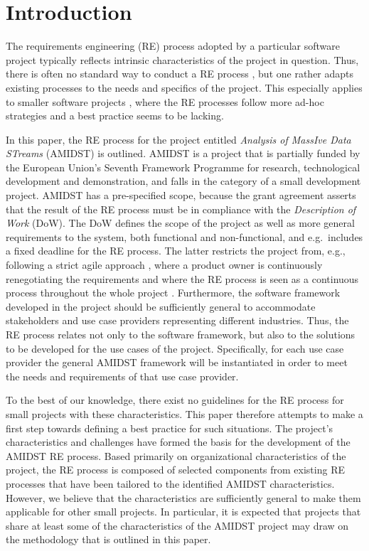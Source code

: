 \section{Introduction}

The requirements engineering (RE) process adopted by a particular software project typically reflects intrinsic
characteristics of the project in question. Thus, there is often no standard way to conduct a RE process \cite{Poh10},
but one rather adapts existing processes to the needs and specifics of the project. This especially applies to smaller
software projects \cite{Qui10,Ara07}, where the RE processes follow
more ad-hoc strategies and a best practice seems to be lacking. 

In this paper, the RE process for the project entitled \emph{Analysis of MassIve Data STreams} (AMIDST) is outlined. AMIDST is a
project that is partially funded by the European Union's Seventh Framework Programme for research, technological
development and demonstration, and falls in the category of a small development project. AMIDST has a pre-specified
scope, because the grant agreement asserts that the result of the RE process must be in compliance with the \emph{Description
  of Work} (DoW). The DoW defines the scope of the project as well as more general requirements to the system, both
functional and non-functional, and e.g.\ includes a fixed deadline for the RE process. The latter restricts the project from,
e.g., following a strict agile approach \cite{Din10},  where a product owner is continuously renegotiating the
requirements and where the RE process is seen as a continuous process throughout the whole project
\cite{Kav11}. Furthermore, the software framework developed in the project should be sufficiently general to accommodate
stakeholders and use case providers representing different industries. Thus, the RE process relates not only to the software framework, but also to the solutions to be developed
for the use cases of the project. Specifically, for each use case provider the general AMIDST framework will be instantiated in order
to meet the needs and requirements of that use case provider. 

To the best of our knowledge, there exist no guidelines for the RE process for small projects with these
characteristics. This paper therefore  attempts to make a first step towards defining a best practice for such
situations. The project's characteristics and challenges have formed the basis for the development of the AMIDST RE
process. Based primarily on organizational characteristics of the project, the RE process is composed of selected
components from existing RE processes that have been tailored to the identified AMIDST characteristics. However, we
believe that the characteristics are sufficiently general to make them applicable for other small projects. In particular, it is expected that projects that share at least some of the characteristics of the AMIDST project may draw on the methodology that is outlined in this paper.

